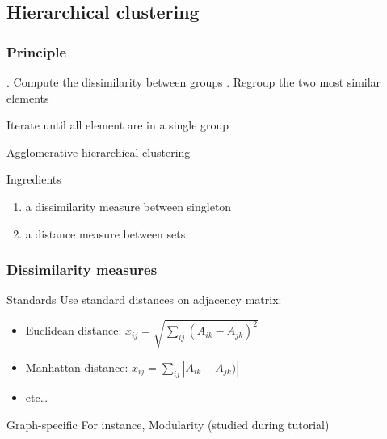 \documentclass{beamer}\usepackage[]{graphicx}\usepackage[]{color}
\begin{document}
\subsection{Hierarchical clustering}

\begin{frame}
  \frametitle{Principle}


  \begin{algorithm}[H]
    \BlankLine\BlankLine
    . Compute the dissimilarity between groups . Regroup the two most similar elements \;
      
      Iterate until all element are in a single group \;
    \BlankLine\BlankLine

    \caption{Agglomerative hierarchical clustering}
  \end{algorithm}
  
  \begin{block}{Ingredients}
    \begin{enumerate}
      \item a dissimilarity measure between singleton
      \item a distance measure between sets
    \end{enumerate}
  \end{block}

\end{frame}

\begin{frame}
  \frametitle{Dissimilarity measures}

  \begin{block}{Standards}
    Use standard distances on adjacency matrix:
    \begin{itemize}
      \item Euclidean distance: $\displaystyle x_{ij} = \sqrt{\sum_{ij} (A_{ik} - A_{jk})^2} $
      \item Manhattan distance: $\displaystyle x_{ij} = \sum_{ij} |A_{ik} - A_{jk})| $
      \item  etc\dots
    \end{itemize}  
  \end{block}

  \vfill

  \begin{block}{Graph-specific}
    For instance,  Modularity (studied during tutorial)
  \end{block}
  
\end{frame}
\end{document}
